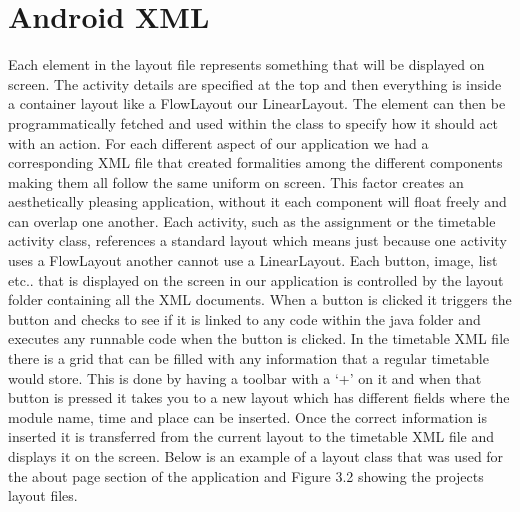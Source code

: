 \section{Android XML}
Each element in the layout file represents something that will be displayed on screen. The activity details are specified at the top and then everything is inside a container layout like a FlowLayout our LinearLayout. The element can then be programmatically fetched and used within the class to specify how it should act with an action. For each different aspect of our application we had a corresponding XML file that created formalities among the different components making them all follow the same uniform on screen. This factor creates an aesthetically pleasing application, without it each component will float freely and can overlap one another. Each activity, such as the assignment or the timetable activity class, references a standard layout which means just because one activity uses a FlowLayout another cannot use a LinearLayout. Each button, image, list etc.. that is displayed on the screen in our application is controlled by the layout folder containing all the XML documents. When a button is clicked it triggers the button and checks to see if it is linked to any code within the java folder and executes any runnable code when the button is clicked. In the timetable XML file there is a grid that can be filled with any information that a regular timetable would store. This is done by having a toolbar with a ‘+’ on it and when that button is pressed it takes you to a new layout which has different fields where the module name, time and place can be inserted. Once the correct information is inserted it is transferred from the current layout to the timetable XML file and displays it on the screen. Below is an example of a layout class that was used for the about page section of the application and Figure 3.2 showing the projects layout files.
 \pagebreak
